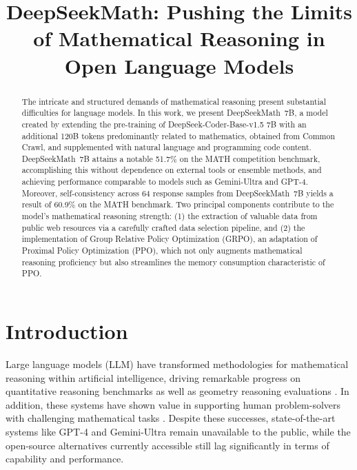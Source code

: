 \title{DeepSeekMath: Pushing the Limits of Mathematical Reasoning in Open Language Models}

\begin{abstract}
The intricate and structured demands of mathematical reasoning present substantial difficulties for language models. In this work, we present DeepSeekMath~7B, a model created by extending the pre-training of DeepSeek-Coder-Base-v1.5 7B with an additional 120B tokens predominantly related to mathematics, obtained from Common Crawl, and supplemented with natural language and programming code content. DeepSeekMath~7B attains a notable 51.7\% on the MATH competition benchmark, accomplishing this without dependence on external tools or ensemble methods, and achieving performance comparable to models such as Gemini-Ultra and GPT-4. Moreover, self-consistency across 64 response samples from DeepSeekMath~7B yields a result of 60.9\% on the MATH benchmark. Two principal components contribute to the model’s mathematical reasoning strength: (1) the extraction of valuable data from public web resources via a carefully crafted data selection pipeline, and (2) the implementation of Group Relative Policy Optimization (GRPO), an adaptation of Proximal Policy Optimization (PPO), which not only augments mathematical reasoning proficiency but also streamlines the memory consumption characteristic of PPO.
\end{abstract}

\section{Introduction}

Large language models (LLM) have transformed methodologies for mathematical reasoning within artificial intelligence, driving remarkable progress on quantitative reasoning benchmarks \citep{MATH} as well as geometry reasoning evaluations \citep{trinh2024solving}. In addition, these systems have shown value in supporting human problem-solvers with challenging mathematical tasks \citep{tao}. Despite these successes, state-of-the-art systems like GPT-4 \citep{gpt4} and Gemini-Ultra \citep{gemini} remain unavailable to the public, while the open-source alternatives currently accessible still lag significantly in terms of capability and performance.

